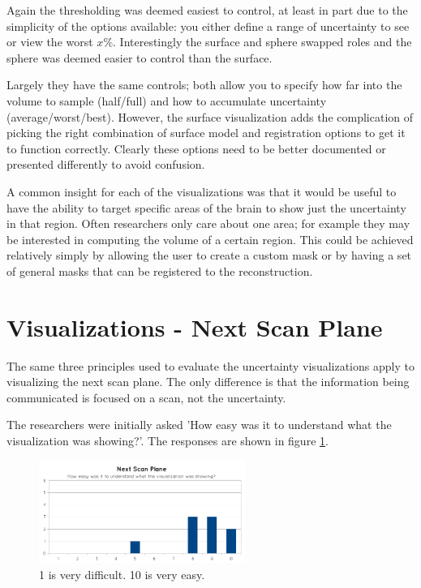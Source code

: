 Again the thresholding was deemed easiest to control, at least in part due to the simplicity of the options available: you either define a range of uncertainty to see or view the worst $x\%$. Interestingly the surface and sphere swapped roles and the sphere was deemed easier to control than the surface.

Largely they have the same controls; both allow you to specify how far into the volume to sample (half/full) and how to accumulate uncertainty (average/worst/best). However, the surface visualization adds the complication of picking the right combination of surface model and registration options to get it to function correctly. Clearly these options need to be better documented or presented differently to avoid confusion.

A common insight for each of the visualizations was that it would be useful to have the ability to target specific areas of the brain to show just the uncertainty in that region. Often researchers only care about one area; for example they may be interested in computing the volume of a certain region. This could be achieved relatively simply by allowing the user to create a custom mask or by having a set of general masks that can be registered to the reconstruction.

\newpage
\section{Visualizations - Next Scan Plane}
The same three principles used to evaluate the uncertainty visualizations apply to visualizing the next scan plane. The only difference is that the information being communicated is focused on a scan, not the uncertainty.

The researchers were initially asked 'How easy was it to understand what the visualization was showing?'. The responses are shown in figure \ref{fig:eval_next_scan_plane_q1}.

\begin{figure}[h]
    \centering
  \includegraphics[width=0.6\textwidth]{images/evaluation/graph_next_scan_plane_1.png}
    \caption{1 is very difficult. 10 is very easy.}\label{fig:eval_next_scan_plane_q1}
\end{figure}

